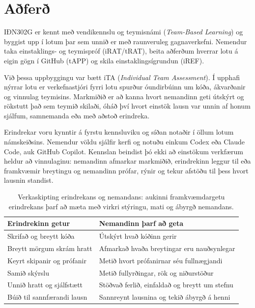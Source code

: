 \documentclass{kennsluakademia_conf}
\begin{document}
\section{Aðferð}\label{auxf0feruxf0}

IÐN302G er kennt með vendikennslu og teymisnámi (\emph{Team-Based
Learning}) og byggist upp í lotum þar sem unnið er með raunveruleg
gagnaverkefni. Nemendur taka einstaklings- og teymispróf (iRAT/tRAT),
beita aðferðum hverrar lotu á eigin gögn í GitHub (tAPP) og skila
einstaklingsígrundun (iREF).

Við þessa uppbyggingu var bætt iTA (\emph{Individual Team Assessment}).
Í upphafi nýrrar lotu er verkefnastjóri fyrri lotu spurður óundirbúinn
um kóða, ákvarðanir og vinnulag teymisins. Markmiðið er að kanna hvort
nemandinn geti útskýrt og rökstutt það sem teymið skilaði, óháð því
hvort einstök lausn var unnin af honum sjálfum, samnemanda eða með
aðstoð erindreka.

Erindrekar voru kynntir á fyrstu kennsluviku og síðan notaðir í öllum
lotum námskeiðsins. Nemendur völdu sjálfir kerfi og notuðu einkum Codex
eða Claude Code, auk GitHub Copilot. Kennslan beindist þó ekki að
einstökum verkfærum heldur að vinnulaginu: nemandinn afmarkar markmiðið,
erindrekinn leggur til eða framkvæmir breytingu og nemandinn prófar,
rýnir og tekur afstöðu til þess hvort lausnin standist.

\begin{table}[t]
\centering
\small
\setlength{\tabcolsep}{8pt}
\renewcommand{\arraystretch}{1.2}
\begin{tabular}{p{}p{}}
\textbf{Erindrekinn getur} & \textbf{Nemandinn þarf að geta} \\
\hline
Skrifað og breytt kóða & Útskýrt hvað kóðinn gerir \\
Breytt mörgum skrám hratt & Afmarkað hvaða breytingar eru nauðsynlegar \\
Keyrt skipanir og prófanir & Metið hvort prófanirnar séu fullnægjandi \\
Samið skýrslu & Metið fullyrðingar, rök og niðurstöður \\
Unnið hratt og sjálfstætt & Stöðvað ferlið, einfaldað og breytt um stefnu \\
Búið til sannfærandi lausn & Sannreynt lausnina og tekið ábyrgð á henni \\
\end{tabular}
\caption{Verkaskipting erindrekans og nemandans: aukinni framkvæmdargetu erindrekans þarf að mæta með virkri stýringu, mati og ábyrgð nemandans.}
\end{table}
\end{document}
